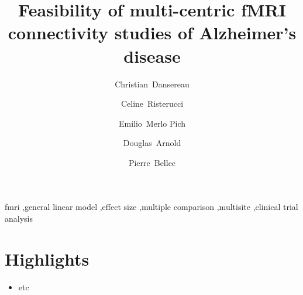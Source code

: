 \documentclass[authoryear]{elsarticle}
\begin{document}
\begin{frontmatter}
\title{Feasibility of multi-centric fMRI connectivity studies of Alzheimer's disease}

\author[a,b]{Christian~Dansereau}
\author[c]{Celine~Risterucci}
\author[c]{Emilio~Merlo Pich}
\author[d]{Douglas~Arnold}
\author[a,b]{Pierre~Bellec}
\address[a]{Centre de Recherche de l'Institut Universitaire de G\'eriatrie de Montr\'eal, Montr\'eal, CA}
\address[b]{D\'epartement d'Informatique et de recherche op\'erationnelle, Universit\'e de Montr\'eal, Montr\'eal,CA}
\address[c]{F. Hoffmann-La Roche Ldt., Basel, Switzerland}
\address[d]{NeuroRx, Montreal, Quebec, Canada}

\begin{abstract}


\end{abstract}

\begin{keyword}
fmri \sep general linear model \sep effect size \sep multiple comparison \sep multisite \sep clinical trial analysis
\end{keyword}
\end{frontmatter}


\section*{Highlights}

\begin{itemize}
\item etc
\end{itemize}
\end{document}
